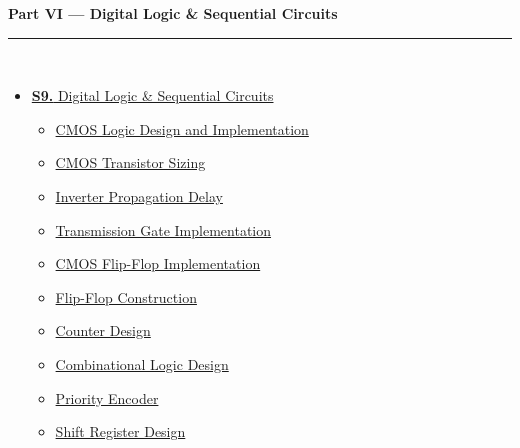 \documentclass[12pt]{article}
\begin{document}
\begin{tcolorbox}[breakable,colback=cD!5,colframe=cD,boxrule=1pt,arc=5pt,
  left=8pt,right=8pt,top=8pt,bottom=8pt,before skip=4pt]
  {\large\bfseries\textcolor{cD}{Part VI --- Digital Logic \& Sequential Circuits}}\\[5pt]
  \textcolor{cD!40}{\rule{\textwidth}{0.4pt}}\\[3pt]
  \small\begin{itemize}[leftmargin=1.2em,itemsep=1pt,label={\textcolor{cD}{$\triangleright$}}]
    \item \hyperref[sec:S9]{\textbf{S9.} Digital Logic \& Sequential Circuits}
      \begin{itemize}[leftmargin=1.5em,itemsep=0pt,label={\textcolor{cD}{$\cdot$}}]
        \item \hyperref[sub:s9-cmos]{CMOS Logic Design and Implementation}
        \item \hyperref[sub:s9-sizing]{CMOS Transistor Sizing}
        \item \hyperref[sub:s9-delay]{Inverter Propagation Delay}
        \item \hyperref[sub:s9-tg]{Transmission Gate Implementation}
        \item \hyperref[sub:s9-ff-cmos]{CMOS Flip-Flop Implementation}
        \item \hyperref[sub:s9-ff-construction]{Flip-Flop Construction}
        \item \hyperref[sub:s9-counter]{Counter Design}
        \item \hyperref[sub:s9-combo]{Combinational Logic Design}
        \item \hyperref[sub:s9-encoder]{Priority Encoder}
        \item \hyperref[sub:s9-shift]{Shift Register Design}
      \end{itemize}
  \end{itemize}
\end{tcolorbox}

\vspace{6pt}
\end{document}
